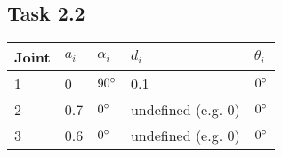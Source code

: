 \subsection*{Task 2.2}
\begin{center}
	\begin{tabular}{ | l | l | l | l | l |}
		\hline
		Joint & $a_{i}$ & $\alpha_{i}$ & $d_i$ & $\theta_i$ \\ \hline
		1 & 0 & $90\degree$ & 0.1 & $0\degree$\\ \hline
		2 & 0.7 & $0\degree$ & undefined (e.g. 0) & $0\degree$\\ \hline
		3 & 0.6 & $0\degree$ & undefined (e.g. 0) & $0\degree$\\ \hline
	\end{tabular}
\end{center}